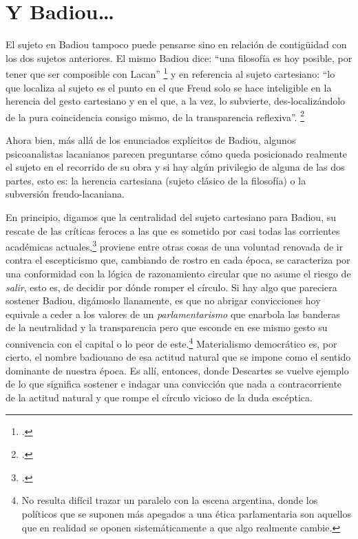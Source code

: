 \section{Y Badiou\ldots}


El sujeto en Badiou tampoco puede pensarse sino en relación de contigüidad con los dos sujetos anteriores. El mismo Badiou dice: \enquote{una filosofía es hoy posible, por tener que ser composible con Lacan} \footcite[][55]{@7126-BADIOU2007} y en referencia al sujeto cartesiano: \enquote{lo que localiza al sujeto es el punto en el que Freud solo se hace inteligible en la herencia del gesto cartesiano y en el que, a la vez, lo subvierte, des-localizándolo de la pura coincidencia consigo mismo, de la transparencia reflexiva}. \footcite[][473]{@7130-BADIOU2007}

Ahora bien, más allá de los enunciados explícitos de Badiou, algunos psicoanalistas lacanianos parecen preguntarse cómo queda posicionado realmente el sujeto en el recorrido de su obra y si hay algún privilegio de alguna de las dos partes, esto es: la herencia cartesiana (sujeto clásico de la filosofía) o la subversión freudo-lacaniana.

En principio, digamos que la centralidad del sujeto cartesiano para Badiou, su rescate de las críticas feroces a las que es sometido por casi todas las corrientes académicas actuales,\footcite[][9]{@7063-ZIZEK2005} proviene entre otras cosas de una voluntad renovada de ir contra el escepticismo que, cambiando de rostro en cada época, se caracteriza por una conformidad con la lógica de razonamiento circular que no asume el riesgo de \emph{salir}, esto es, de decidir por dónde romper el círculo. Si hay algo que pareciera sostener Badiou, digámoslo llanamente, es que no abrigar convicciones hoy equivale a ceder a los valores de un \emph{parlamentarismo} que enarbola las banderas de la neutralidad y la transparencia pero que esconde en ese mismo gesto su connivencia con el capital o lo peor de este.\footnote{No resulta difícil trazar un paralelo con la escena argentina, donde los políticos que se suponen más apegados a una ética parlamentaria son aquellos que en realidad se oponen sistemáticamente a que algo realmente cambie.} Materialismo democrático es, por cierto, el nombre badiouano de esa actitud natural que se impone como el sentido dominante de nuestra época. Es allí, entonces, donde Descartes se vuelve ejemplo de lo que significa sostener e indagar una convicción que nada a contracorriente de la actitud natural y que rompe el círculo vicioso de la duda escéptica.

